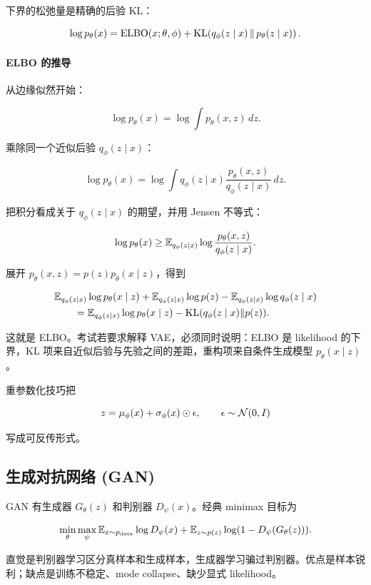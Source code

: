 下界的松弛量是精确的后验 KL：

\[
  \log p_\theta(x)=\operatorname{ELBO}(x;\theta,\phi)+\operatorname{KL}\!\left(q_\phi(z\mid x)\,\middle\|\,p_\theta(z\mid x)\right).
\]

\paragraph{ELBO 的推导}

从边缘似然开始：

\[
  \log p_\theta(x)
  =
  \log
  \int p_\theta(x,z)\,dz.
\]

乘除同一个近似后验 \(q_\phi(z\mid x)\)：

\[
  \log p_\theta(x)
  =
  \log
  \int
  q_\phi(z\mid x)
  \frac{p_\theta(x,z)}{q_\phi(z\mid x)}
  \,dz.
\]

把积分看成关于 \(q_\phi(z\mid x)\) 的期望，并用 Jensen 不等式：

\[
  \log p_\theta(x)
  \ge
  \mathbb{E}_{q_\phi(z\mid x)}
  \log
  \frac{p_\theta(x,z)}{q_\phi(z\mid x)}.
\]

展开 \(p_\theta(x,z)=p(z)p_\theta(x\mid z)\)，得到

\[
\begin{aligned}
  &\mathbb{E}_{q_\phi(z\mid x)}\log p_\theta(x\mid z)
  +
  \mathbb{E}_{q_\phi(z\mid x)}\log p(z)
  -
  \mathbb{E}_{q_\phi(z\mid x)}\log q_\phi(z\mid x)
  \\
  &\qquad =
  \mathbb{E}_{q_\phi(z\mid x)}\log p_\theta(x\mid z)
  -
  \operatorname{KL}(q_\phi(z\mid x)\|p(z)).
\end{aligned}
\]

这就是 ELBO。考试若要求解释 VAE，必须同时说明：ELBO 是 likelihood 的下界，KL 项来自近似后验与先验之间的差距，重构项来自条件生成模型 \(p_\theta(x\mid z)\)。

重参数化技巧把

\[
  z=\mu_\phi(x)+\sigma_\phi(x)\odot\epsilon,
  \qquad
  \epsilon\sim\mathcal{N}(0,I)
\]

写成可反传形式。

\subsection{生成对抗网络 (GAN)}

GAN 有生成器 \(G_\theta(z)\) 和判别器 \(D_\psi(x)\)。经典 minimax 目标为

\[
  \min_\theta\max_\psi
  \mathbb{E}_{x\sim p_{\mathrm{data}}}\log D_\psi(x)
  +
  \mathbb{E}_{z\sim p(z)}
  \log(1-D_\psi(G_\theta(z))).
\]

直觉是判别器学习区分真样本和生成样本，生成器学习骗过判别器。优点是样本锐利；缺点是训练不稳定、mode collapse、缺少显式 likelihood。

